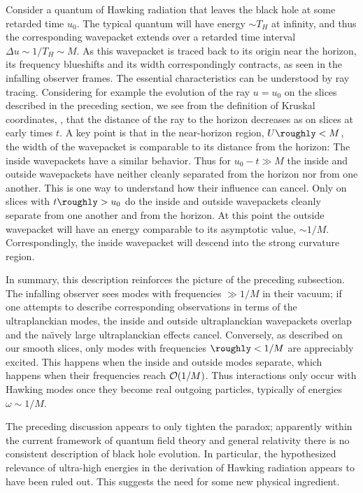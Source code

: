 Consider a quantum of Hawking radiation that leaves the black hole at some retarded time $u_0$.  The typical quantum will have
energy $\sim T_H$ at infinity, and thus the corresponding wavepacket extends over a retarded time interval $\Delta u\sim 1/T_H\sim M$.  As this wavepacket is traced back to its origin near the horizon, its frequency blueshifts and its width correspondingly contracts, as seen in the infalling observer frames.  The essential characteristics can be understood by ray tracing.  Considering for example the evolution of the ray $u=u_0$ on the slices described in the preceding section, we see from the definition of Kruskal coordinates, \kruskdef, that the distance of the ray to the horizon decreases as
%
\eqn{}
%
on slices at early times $t$.  A key point is that in the near-horizon region, $U\roughly<M$, the width of the wavepacket is comparable to its distance from the horizon:
%
\eqn{}
%
The inside wavepackets have a similar behavior.  Thus for $u_0-t\gg M$ the inside and outside wavepackets have neither cleanly separated from the horizon nor from one another.  This is one way to understand how their influence can cancel.  Only on slices with $t\roughly>u_0$ do the inside and outside wavepackets cleanly separate from one another and from the horizon. At this point the outside wavepacket will have an energy comparable to its asymptotic value, $\sim 1/M$.  Correspondingly, the inside wavepacket will descend into the strong curvature region.

In summary, this description reinforces the picture of the preceding subsection.  The infalling observer sees modes with frequencies $\gg 1/M$ in their vacuum; if one attempts to describe corresponding observations in terms of the ultraplanckian modes, the inside and outside ultraplanckian wavepackets overlap and the na\"\i vely large ultraplanckian effects cancel.  Conversely, as described on our smooth slices, only modes with frequencies $\roughly<1/M$ are appreciably excited.  This happens when the inside and outside modes separate, which happens when their frequencies reach ${\cal O}(1/M)$.  Thus interactions only occur with Hawking modes once they become real outgoing particles, typically of energies $\omega\sim 1/M$.


The preceding discussion appears to only tighten the paradox; apparently within the current framework of quantum field theory and general relativity there is no consistent description of black hole evolution.  In particular, the hypothesized relevance of ultra-high energies  in the derivation of Hawking radiation appears to have been   ruled out.  This suggests the need for some new physical ingredient.

